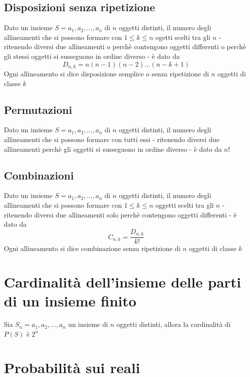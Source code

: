 \documentclass[a4paper]{report}
\begin{document}
  \subsection{Disposizioni senza ripetizione}
  Dato un insieme $S={a_1,a_2,...,a_n}$ di $n$ oggetti distinti, il numero degli allineamenti che si possono formare con $1 \leq k \leq n$ ogetti scelti tra gli $n$ - ritenendo diversi due allineamenti o perchè contengono oggetti differenti o perchè gli stessi oggetti si susseguono in ordine diverso - è dato da
  \[ D_{n,k} = n(n-1)(n-2)...(n-k + 1) \]
  Ogni allineamento si dice disposizione semplice o senza ripetizione di $n$ oggetti di classe $k$

  \subsection{Permutazioni}
  Dato un insieme $S={a_1,a_2,...,a_n}$ di $n$ oggetti distinti, il numero degli allineamenti che si possono formare con tutti essi - ritenendo diversi due allineamenti perchè gli oggetti si susseguono in ordine diverso - è dato da $n!$

  \subsection{Combinazioni}
  Dato un insieme $S={a_1,a_2,...,a_n}$ di $n$ oggetti distinti, il numero degli allineamenti che si possono formare con $1 \leq k \leq n$ oggetti scelti tra gli $n$ - ritenendo diversi due allineamenti solo perchè contengono oggetti differenti - è dato da
  \[ C_{n,k} = \frac{D_{n,k}}{k!} \]
  Ogni allineamento si dice combinazione senza ripetizione di $n$ oggetti di classe $k$

  \section{Cardinalità dell'insieme delle parti di un insieme finito}
  Sia $S_n={a_1,a_2,...,a_n}$ un insieme di $n$ oggetti distinti, allora la cardinalità di $P(S)$ è $ 2^n$

  \section{Probabilità sui reali}
\end{document}

